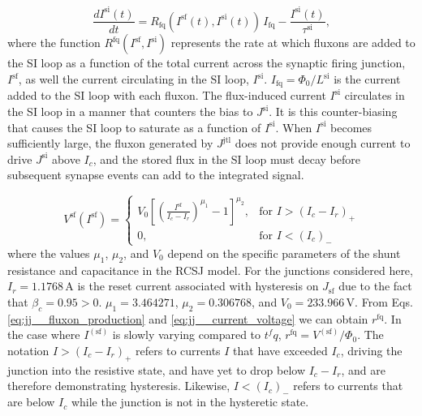 \documentclass[twocolumn]{article}
\begin{document}
\begin{equation}
\label{eq:synapses__leaky_integrator}
\frac{dI^{\mathrm{si}}(t)}{dt} = R_{\mathrm{fq}}\left(I^{\mathrm{sf}}(t),I^{\mathrm{si}}(t)\right)\,I_{\mathrm{fq}} -\frac{I^{\mathrm{si}}(t)}{\tau^{\mathrm{si}}},
\end{equation}
where the function $R^{\mathrm{fq}}\left(I^{\mathrm{sf}},I^{\mathrm{si}}\right)$ represents the rate at which fluxons are added to the SI loop as a function of the total current across the synaptic firing junction, $I^{\mathrm{sf}}$, as well the current circulating in the SI loop, $I^{\mathrm{si}}$. $I_{\mathrm{fq}} = \Phi_0/L^{\mathrm{si}}$ is the current added to the SI loop with each fluxon. The flux-induced current $I^{\mathrm{si}}$ circulates in the SI loop in a manner that counters the bias to $J^{\mathrm{si}}$. It is this counter-biasing that causes the SI loop to saturate as a function of $I^{\mathrm{si}}$. When $I^{\mathrm{si}}$ becomes sufficiently large, the fluxon generated by $J^{\mathrm{jtl}}$ does not provide enough current to drive $J^{\mathrm{si}}$ above $I_c$, and the stored flux in the SI loop must decay before subsequent synapse events can add to the integrated signal.

\begin{equation}
\label{eq:jj__current_voltage}
V^{\mathrm{sf}}(I^{\mathrm{sf}}) = \begin{cases} V_0\left[ \left( \frac{I^{\mathrm{sf}}}{I_c-I_r} \right)^{\mu_1} - 1 \right]^{\mu_2}, & \text{for } I > (I_c-I_r)_+ \\
0, & \text{for } I < (I_c)_-
\end{cases}
\end{equation} 
where the values $\mu_1$, $\mu_2$, and $V_0$ depend on the specific parameters of the shunt resistance and capacitance in the RCSJ model. For the junctions considered here, $I_r = 1.1768$\,\textmu A is the reset current associated with hysteresis on $J_{\mathrm{sf}}$ due to the fact that $\beta_c = 0.95 > 0$. $\mu_1 = 3.464271$, $\mu_2 = 0.306768$, and $V_0 = 233.966$\,\textmu V. From Eqs.\,\ref{eq:jj__fluxon_production} and \ref{eq:jj__current_voltage} we can obtain $r^{\mathrm{fq}}$. In the case where $I^{(\mathrm{sf})}$ is slowly varying compared to $t^fq$, $ r^{\mathrm{fq}} = V^{(\mathrm{sf})}/\Phi_0$. The notation $I > (I_c-I_r)_+$ refers to currents $I$ that have exceeded $I_c$, driving the junction into the resistive state, and have yet to drop below $I_c-I_r$, and are therefore demonstrating hysteresis. Likewise, $I<(I_c)_-$ refers to currents that are below $I_c$ while the junction is not in the hysteretic state.
\end{document}
